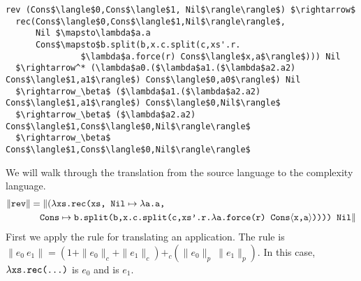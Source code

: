 \begin{lstlisting}
rev (Cons$\langle$0,Cons$\langle$1, Nil$\rangle\rangle$) $\rightarrow$ 
  rec(Cons$\langle$0,Cons$\langle$1,Nil$\rangle\rangle$,
      Nil $\mapsto\lambda$a.a
      Cons$\mapsto$b.split(b,x.c.split(c,xs'.r.
               $\lambda$a.force(r) Cons$\langle$x,a$\rangle$))) Nil
  $\rightarrow^* (\lambda$a0.($\lambda$a1.($\lambda$a2.a2) Cons$\langle$1,a1$\rangle$) Cons$\langle$0,a0$\rangle$) Nil
  $\rightarrow_\beta$ ($\lambda$a1.($\lambda$a2.a2) Cons$\langle$1,a1$\rangle$) Cons$\langle$0,Nil$\rangle$
  $\rightarrow_\beta$ ($\lambda$a2.a2) Cons$\langle$1,Cons$\langle$0,Nil$\rangle\rangle$
  $\rightarrow_\beta$ Cons$\langle$1,Cons$\langle$0,Nil$\rangle\rangle$
\end{lstlisting}

We will walk through the translation from the source language to the complexity
language.
%
\begin{align*}
  \|\texttt{rev}\| &= \|(\lambda\texttt{xs.rec(xs, Nil}\mapsto\lambda\texttt{a.a,} \\
              &\quad \texttt{Cons}\mapsto\texttt{b.split(b,x.c.split(c,xs'.r.}\lambda\texttt{a.force(r) Cons}\langle\texttt{x,a}\rangle\texttt{)))) Nil}\|
\end{align*}
%
First we apply the rule for translating an application. The rule is
$\|e_0\ e_1\| = (1 + \|e_0\|_c + \|e_1\|_c) +_c (\|e_0\|_p\ \|e_1\|_p)$.
In this case, $\lambda\texttt{xs.rec(...)}$ is $e_0$ and  is $e_1$.

